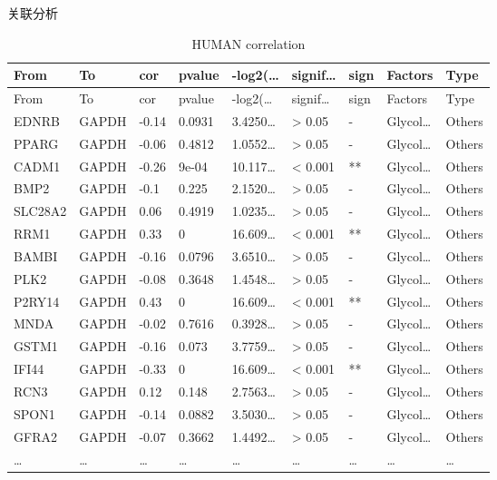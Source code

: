 \documentclass[
  ignorenonframetext,
]{beamer}
\begin{document}
\begin{frame}[fragile]{关联分析}
\begin{longtable}[]{@{}lllllllll@{}}
\caption{HUMAN correlation}\tabularnewline
\toprule
From & To & cor & pvalue & -log2(\ldots{} & signif\ldots{} & sign &
Factors & Type\tabularnewline
\midrule
\endfirsthead
\toprule
From & To & cor & pvalue & -log2(\ldots{} & signif\ldots{} & sign &
Factors & Type\tabularnewline
\midrule
\endhead
EDNRB & GAPDH & -0.14 & 0.0931 & 3.4250\ldots{} & \textgreater{} 0.05 &
- & Glycol\ldots{} & Others\tabularnewline
PPARG & GAPDH & -0.06 & 0.4812 & 1.0552\ldots{} & \textgreater{} 0.05 &
- & Glycol\ldots{} & Others\tabularnewline
CADM1 & GAPDH & -0.26 & 9e-04 & 10.117\ldots{} & \textless{} 0.001 & **
& Glycol\ldots{} & Others\tabularnewline
BMP2 & GAPDH & -0.1 & 0.225 & 2.1520\ldots{} & \textgreater{} 0.05 & - &
Glycol\ldots{} & Others\tabularnewline
SLC28A2 & GAPDH & 0.06 & 0.4919 & 1.0235\ldots{} & \textgreater{} 0.05 &
- & Glycol\ldots{} & Others\tabularnewline
RRM1 & GAPDH & 0.33 & 0 & 16.609\ldots{} & \textless{} 0.001 & ** &
Glycol\ldots{} & Others\tabularnewline
BAMBI & GAPDH & -0.16 & 0.0796 & 3.6510\ldots{} & \textgreater{} 0.05 &
- & Glycol\ldots{} & Others\tabularnewline
PLK2 & GAPDH & -0.08 & 0.3648 & 1.4548\ldots{} & \textgreater{} 0.05 & -
& Glycol\ldots{} & Others\tabularnewline
P2RY14 & GAPDH & 0.43 & 0 & 16.609\ldots{} & \textless{} 0.001 & ** &
Glycol\ldots{} & Others\tabularnewline
MNDA & GAPDH & -0.02 & 0.7616 & 0.3928\ldots{} & \textgreater{} 0.05 & -
& Glycol\ldots{} & Others\tabularnewline
GSTM1 & GAPDH & -0.16 & 0.073 & 3.7759\ldots{} & \textgreater{} 0.05 & -
& Glycol\ldots{} & Others\tabularnewline
IFI44 & GAPDH & -0.33 & 0 & 16.609\ldots{} & \textless{} 0.001 & ** &
Glycol\ldots{} & Others\tabularnewline
RCN3 & GAPDH & 0.12 & 0.148 & 2.7563\ldots{} & \textgreater{} 0.05 & - &
Glycol\ldots{} & Others\tabularnewline
SPON1 & GAPDH & -0.14 & 0.0882 & 3.5030\ldots{} & \textgreater{} 0.05 &
- & Glycol\ldots{} & Others\tabularnewline
GFRA2 & GAPDH & -0.07 & 0.3662 & 1.4492\ldots{} & \textgreater{} 0.05 &
- & Glycol\ldots{} & Others\tabularnewline
\ldots{} & \ldots{} & \ldots{} & \ldots{} & \ldots{} & \ldots{} &
\ldots{} & \ldots{} & \ldots{}\tabularnewline
\bottomrule
\end{longtable}
\end{frame}
\end{document}
